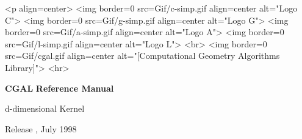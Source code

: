 
\pagestyle{empty}

\begin{titlepage}
\mbox{}
\vskip3cm

\ccTexHtml
{\centerline{
    }}
 {<p align=center>
   <img border=0 src=Gif/c-simp.gif align=center alt="Logo C">
   <img border=0 src=Gif/g-simp.gif align=center alt="Logo G">
   <img border=0 src=Gif/a-simp.gif align=center alt="Logo A">
   <img border=0 src=Gif/l-simp.gif align=center alt="Logo L">
   <br>
   <img border=0 src=Gif/cgal.gif align=center
    alt="[Computational Geometry Algorithms Library]">
    <hr>}

\vskip2cm
\centerline{ {\Huge\bf CGAL} {\huge\bf Reference Manual } }
\vskip1cm
\centerline{ {\huge d-dimensional Kernel} }

\vskip2cm
\newcommand{\mydate}{July 1998}
\ccTexHtml
{\renewcommand{\mydate}{\ifcase\the\month \or January\or
    February\or March\or April\or May\or June\or July\or August\or
    September\or October\or November\or December\fi~\the\year}}{}
  \centerline{ {\large Release \cgalrelease, \mydate} }

\end{titlepage}




